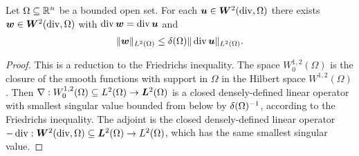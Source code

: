 \documentclass[10pt,a4paper]{article}
\begin{document}
\begin{lemma}\label{lemma:PFfordivergence}
    Let $\Omega \subseteq {\mathbb R}^{n}$ be a bounded open set. 
    For each $\bm{u} \in \bm{W}^{2}(\operatorname{div},\Omega)$ there exists $\bm{w} \in \bm{W}^{2}(\operatorname{div},\Omega)$ with $\operatorname{div} \bm{w} = \operatorname{div} \bm{u}$ and 
    \begin{align*}
        \| \bm{w} \|_{L^{2}(\Omega)} 
        \leq 
        {\delta}(\Omega) \| \operatorname{div} \bm{u} \|_{L^{2}(\Omega)}
        .
    \end{align*}
\end{lemma}
\begin{proof}
    This is a reduction to the Friedrichs inequality. 
    The space $W^{1,2}_{0}(\Omega)$ is the closure of the smooth functions with support in $\Omega$ in the Hilbert space $W^{1,2}(\Omega)$. 
    Then $\nabla : W^{1,2}_{0}(\Omega) \subseteq L^{2}(\Omega) \rightarrow \bm{L}^{2}(\Omega)$ is a closed densely-defined linear operator 
    with smallest singular value bounded from below by ${\delta}(\Omega)^{-1}$, according to the Friedrichs inequality. 
    The adjoint is the closed densely-defined linear operator $-\operatorname{div} : \bm{W}^{2}(\operatorname{div},\Omega) \subseteq \bm{L}^{2}(\Omega) \rightarrow L^{2}(\Omega)$,
    which has the same smallest singular value. 
\end{proof}
\end{document}

